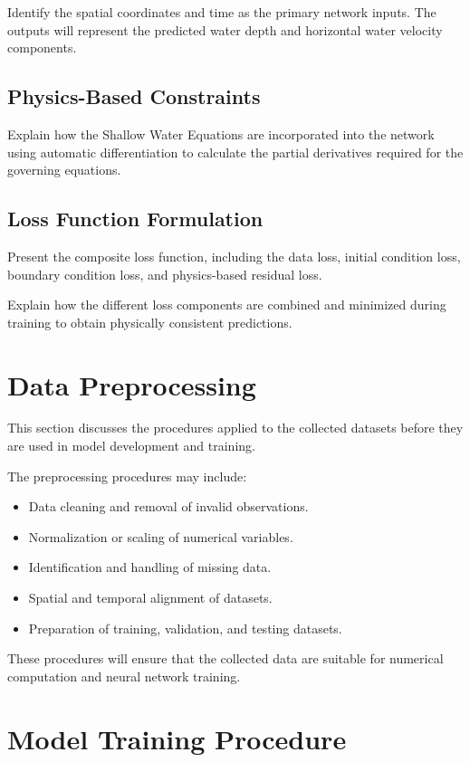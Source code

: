 Identify the spatial coordinates and time as the primary network inputs. The outputs will represent the predicted water depth and horizontal water velocity components.

\subsection{Physics-Based Constraints}

Explain how the Shallow Water Equations are incorporated into the network using automatic differentiation to calculate the partial derivatives required for the governing equations.

\subsection{Loss Function Formulation}

Present the composite loss function, including the data loss, initial condition loss, boundary condition loss, and physics-based residual loss.

Explain how the different loss components are combined and minimized during training to obtain physically consistent predictions.

\section{Data Preprocessing}

This section discusses the procedures applied to the collected datasets before they are used in model development and training.

The preprocessing procedures may include:

\begin{itemize}
    \item Data cleaning and removal of invalid observations.
    \item Normalization or scaling of numerical variables.
    \item Identification and handling of missing data.
    \item Spatial and temporal alignment of datasets.
    \item Preparation of training, validation, and testing datasets.
\end{itemize}

These procedures will ensure that the collected data are suitable for numerical computation and neural network training.

\section{Model Training Procedure}

